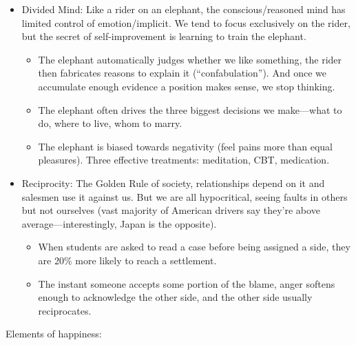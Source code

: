 \documentclass[
]{article}
\begin{document}
\begin{itemize}
\item
  Divided Mind: Like a rider on an elephant, the conscious/reasoned mind
  has limited control of emotion/implicit. We tend to focus exclusively
  on the rider, but the secret of self-improvement is learning to train
  the elephant.

  \begin{itemize}
  \item
    The elephant automatically judges whether we like something, the
    rider then fabricates reasons to explain it (``confabulation''). And
    once we accumulate enough evidence a position makes sense, we stop
    thinking.
  \item
    The elephant often drives the three biggest decisions we make---what
    to do, where to live, whom to marry.
  \item
    The elephant is biased towards negativity (feel pains more than
    equal pleasures). Three effective treatments: meditation, CBT,
    medication.
  \end{itemize}
\item
  Reciprocity: The Golden Rule of society, relationships depend on it
  and salesmen use it against us. But we are all hypocritical, seeing
  faults in others but not ourselves (vast majority of American drivers
  say they're above average---interestingly, Japan is the opposite).

  \begin{itemize}
  \item
    When students are asked to read a case before being assigned a side,
    they are 20\% more likely to reach a settlement.
  \item
    The instant someone accepts some portion of the blame, anger softens
    enough to acknowledge the other side, and the other side usually
    reciprocates.
  \end{itemize}
\end{itemize}

Elements of happiness:
\end{document}
